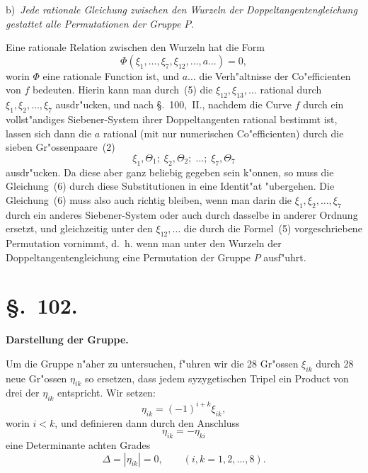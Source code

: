 \documentclass[12pt,a4paper]{article}
\theoremstyle{plain}
\begin{document}
b)~\emph{Jede rationale Gleichung zwischen den Wurzeln der Doppeltangentengleichung gestattet alle Permutationen der Gruppe $P$.}

Eine rationale Relation zwischen den Wurzeln hat die Form
\begin{equation}\tag{6}
\Phi(\xi_1,\ldots,\xi_7,\xi_{12},\ldots,a\ldots)=0,
\end{equation}
worin $\Phi$ eine rationale Function ist, und $a\ldots$ die Verh"altnisse der Co"efficienten von $f$ bedeuten. Hierin kann man durch~(5) die $\xi_{12},\xi_{13},\ldots$ rational durch $\xi_1,\xi_2,\ldots,\xi_7$ ausdr"ucken, und nach \S.~100,~II., nachdem die Curve $f$ durch ein vollst"andiges Siebener-System ihrer Doppeltangenten rational bestimmt ist, lassen sich dann die $a$ rational (mit nur numerischen Co"efficienten) durch die sieben Gr"ossenpaare~(2)
\[\xi_1,\Theta_1;\; \xi_2,\Theta_2;\; \ldots;\; \xi_7,\Theta_7\]
ausdr"ucken. Da diese aber ganz beliebig gegeben sein k"onnen, so muss die Gleichung~(6) durch diese Substitutionen in eine Identit"at "ubergehen. Die Gleichung~(6) muss also auch richtig bleiben, wenn man darin die $\xi_1,\xi_2,\ldots,\xi_7$ durch ein anderes Siebener-System oder auch durch dasselbe in anderer Ordnung ersetzt, und gleichzeitig unter den $\xi_{12},\ldots$ die durch die Formel~(5) vorgeschriebene Permutation vornimmt, d.~h. wenn man unter den Wurzeln der Doppeltangentengleichung eine Permutation der Gruppe $P$ ausf"uhrt.



\newpage
\section*{\S.~102.}
\begin{center}
\large\bfseries Darstellung der Gruppe.
\end{center}
\vspace{0.5em}

Um die Gruppe n"aher zu untersuchen, f"uhren wir die 28 Gr"ossen $\xi_{ik}$ durch 28 neue Gr"ossen $\eta_{ik}$ so ersetzen, dass jedem syzygetischen Tripel ein Product von drei der $\eta_{ik}$ entspricht. Wir setzen:
\begin{equation}\tag{1}
\eta_{ik} = (-1)^{i+k}\xi_{ik},
\end{equation}
worin $i<k$, und definieren dann durch den Anschluss
\begin{equation}\tag{2}
\eta_{ik} = -\eta_{ki}
\end{equation}
eine Determinante achten Grades
\[\Delta = |\eta_{ik}| = 0, \qquad (i,k=1,2,\ldots,8).\]
\setcounter{equation}{2}
\end{document}
